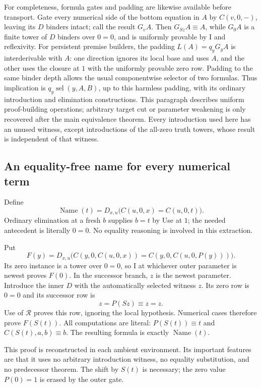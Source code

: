 For completeness, formula gates and padding are likewise available before
transport.  Gate every numerical side of the bottom equation in $A$ by
$C(v,0,-)$, leaving its $D$ binders intact; call the result $G_vA$.
Then $G_{Sz}A\equiv A$, while $G_0A$ is a finite tower of $D$ binders
over $0=0$, and is uniformly provable by I and reflexivity.
For persistent premise builders, the padding $L(A)=q_yG_yA$ is
interderivable with $A$: one direction
ignores its local base and uses $A$, and the other uses the closure at
$1$ with the uniformly provable zero row.  Padding to the same binder
depth allows the usual componentwise selector of two formulas.  Thus
implication is $q_y\operatorname{sel}(y,A,B)$, up to this harmless
padding, with its ordinary introduction and elimination constructions.
This paragraph describes uniform proof-building operations; arbitrary
target cut or parameter weakening is only recovered after the main
equivalence theorem. Every introduction used here has an unused witness,
except introductions
of the all-zero truth towers, whose result is independent of that witness.

\subsection{An equality-free name for every numerical term}

Define
\[
 \operatorname{Name}(t)
   =D_{x,u}\bigl(C(u,0,x)=C(u,0,t)\bigr).
\]
Ordinary elimination at a fresh $b$ supplies $b=t$ by Use at $1$;
the needed antecedent is literally $0=0$.  No equality reasoning is
involved in this extraction.

Put
\[
 F(y)=D_{x,u}\bigl(
 C(y,0,C(u,0,x))=C(y,0,C(u,0,P(y)))\bigr).
\]
Its zero instance is a tower over $0=0$, so I at whichever outer
parameter is newest proves $F(0)$.  In the successor branch, $z$ is
the newest parameter.  Introduce the inner $D$ with the automatically
selected witness $z$.  Its zero row is $0=0$ and its successor row is
\[
                         z=P(Sz)\equiv z=z.
\]
Use of $\mathcal R$ proves this row, ignoring the local hypothesis.
Numerical cases therefore prove $F(S(t))$.  All computations are
literal: $P(S(t))\equiv t$ and $C(S(t),a,b)\equiv b$.  The resulting
formula is exactly $\operatorname{Name}(t)$.

This proof is reconstructed in each ambient environment.  Its important
features are that it uses no arbitrary introduction witness, no equality
substitution, and no predecessor theorem.  The shift by $S(t)$ is necessary;
the zero value $P(0)=1$ is erased by the outer gate.

